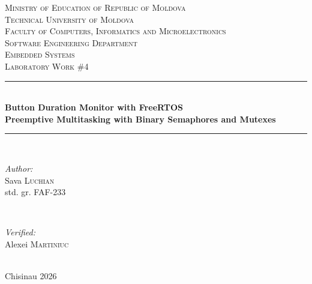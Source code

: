 \documentclass[12pt]{article}
\begin{document}
\begin{titlepage}
  \begin{center}
    \textsc{\large Ministry of Education of Republic of Moldova}\\[0.5cm]
    \textsc{\large Technical University of Moldova}\\[0.5cm]
    \textsc{\large Faculty of Computers, Informatics and Microelectronics}\\[0.5cm]
    \textsc{\large Software Engineering Department}\\[1.2cm]

    \vspace{20mm}
    \textsc{\Large Embedded Systems}\\[0.5cm]
    \textsc{\large Laboratory Work \#4}\\[0.5cm]

    \newcommand{\HRule}{\rule{\linewidth}{0.5mm}}
    \vspace{8mm}
    \HRule\\[0.4cm]
    {\LARGE \bfseries Button Duration Monitor with FreeRTOS\\[0.2cm]
    \large Preemptive Multitasking with Binary Semaphores and Mutexes\\[0.3cm]}
    \HRule\\[1.5cm]

    \begin{minipage}[t]{0.45\textwidth}
      \begin{flushleft}\large
        \emph{Author:}\\
        Sava \textsc{Luchian}\\
        std. gr. FAF-233
      \end{flushleft}
    \end{minipage}
    ~
    \begin{minipage}[t]{0.45\textwidth}
      \begin{flushright}\large
        \emph{Verified:}\\
        Alexei \textsc{Martiniuc}\\
      \end{flushright}
    \end{minipage}\\[2.5cm]

    \large Chisinau 2026
    \vfill
  \end{center}
\end{titlepage}
\end{document}
